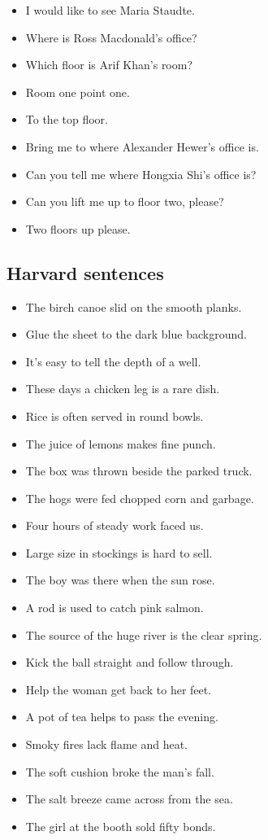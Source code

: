 \documentclass[a4paper, 12pt]{article}
\begin{document}
\begin{appendix}
\begin{itemize}
\item I would like to see Maria Staudte.
\item Where is Ross Macdonald's office?
\item Which floor is Arif Khan's room?
\item Room one point one.
\item To the top floor.
\item Bring me to where Alexander Hewer's office is.
\item Can you tell me where Hongxia Shi's office is?
\item Can you lift me up to floor two, please?
\item Two floors up please.
\end{itemize}

\subsection{Harvard sentences}
\begin{itemize}
\item The birch canoe slid on the smooth planks.
\item Glue the sheet to the dark blue background.
\item It's easy to tell the depth of a well.
\item These days a chicken leg is a rare dish.
\item Rice is often served in round bowls.
\item The juice of lemons makes fine punch.
\item The box was thrown beside the parked truck.
\item The hogs were fed chopped corn and garbage.
\item Four hours of steady work faced us.
\item Large size in stockings is hard to sell.
\item The boy was there when the sun rose.
\item A rod is used to catch pink salmon.
\item The source of the huge river is the clear spring.
\item Kick the ball straight and follow through.
\item Help the woman get back to her feet.
\item A pot of tea helps to pass the evening.
\item Smoky fires lack flame and heat.
\item The soft cushion broke the man's fall.
\item The salt breeze came across from the sea.
\item The girl at the booth sold fifty bonds.
\end{itemize}



\end{appendix}
\end{document}
